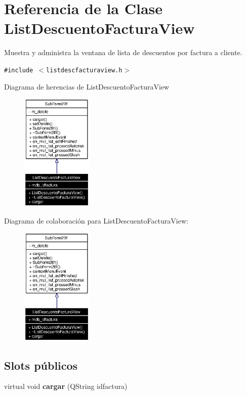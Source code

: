 \section{Referencia de la Clase List\-Descuento\-Factura\-View}
\label{classListDescuentoFacturaView}
Muestra y administra la ventana de lista de descuentos por factura a cliente.  


{\tt \#include $<$listdescfacturaview.h$>$}

Diagrama de herencias de List\-Descuento\-Factura\-View\begin{figure}[H]
\begin{center}
\leavevmode
\includegraphics[width=96pt]{classListDescuentoFacturaView__inherit__graph}
\end{center}
\end{figure}
Diagrama de colaboraci\'{o}n para List\-Descuento\-Factura\-View:\begin{figure}[H]
\begin{center}
\leavevmode
\includegraphics[width=96pt]{classListDescuentoFacturaView__coll__graph}
\end{center}
\end{figure}
\subsection*{Slots p\'{u}blicos}
\begin{CompactItemize}
\item 
virtual void {\bf cargar} (QString idfactura)\label{classListDescuentoFacturaView_i0}

\end{CompactItemize}
